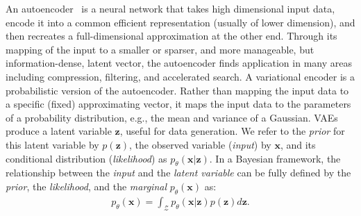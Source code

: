 An autoencoder~\citep{hinton2006reducing_autoencoderintroduction} is a neural network that takes high dimensional input data, encode it into a common efficient representation (usually of lower dimension), and then recreates a full-dimensional approximation at the other end. Through its mapping of the input to a smaller or sparser, and more manageable, but information-dense, latent vector, the autoencoder finds application in many areas including  compression, filtering, and accelerated search. A variational encoder \citep{sgvb, vae_intro_2013, vae2} is a probabilistic version of the autoencoder.  Rather than mapping the input data to a specific (fixed) approximating vector, it maps the input data to the parameters of a probability distribution, e.g., the mean and variance of a Gaussian. VAEs produce a latent variable $\mathbf{z}$, useful for data generation. We refer to the \textit{prior} for this latent variable by $p(\mathbf{z})$, the observed variable (\textit{input}) by $\mathbf{x}$, and its conditional distribution ({\it likelihood}) as $p_{\theta}(\mathbf{x} | \mathbf{z})$. In a Bayesian framework, the relationship between the \textit{input} and the \textit{latent variable} can be fully defined by the \textit{prior}, the \textit{likelihood}, and the \textit{marginal} $p_{\theta}(\mathbf{x})$ as:
\begin{align}
p_{\theta}(\mathbf{x})=\int_{\mathcal{Z}} p_{\theta}(\mathbf{x} | \mathbf{z}) p(\mathbf{z}) d \mathbf{z}. \label{eq:fullDist}
\end{align}


